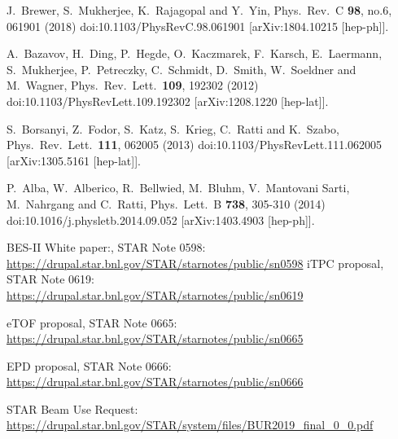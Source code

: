 \begin{thebibliography}{99}
J.~Brewer, S.~Mukherjee, K.~Rajagopal and Y.~Yin,
Phys.\ Rev.\ C \textbf{98}, no.6, 061901 (2018)
doi:10.1103/PhysRevC.98.061901
[arXiv:1804.10215 [hep-ph]].

A.~Bazavov, H.~Ding, P.~Hegde, O.~Kaczmarek, F.~Karsch, E.~Laermann, S.~Mukherjee, P.~Petreczky, C.~Schmidt, D.~Smith, W.~Soeldner and M.~Wagner,
Phys.\ Rev.\ Lett.\  \textbf{109}, 192302 (2012)
doi:10.1103/PhysRevLett.109.192302
[arXiv:1208.1220 [hep-lat]].

S.~Borsanyi, Z.~Fodor, S.~Katz, S.~Krieg, C.~Ratti and K.~Szabo,
Phys.\ Rev.\ Lett.\  \textbf{111}, 062005 (2013)
doi:10.1103/PhysRevLett.111.062005
[arXiv:1305.5161 [hep-lat]].


P.~Alba, W.~Alberico, R.~Bellwied, M.~Bluhm, V.~Mantovani Sarti, M.~Nahrgang and C.~Ratti,
Phys.\ Lett.\ B \textbf{738}, 305-310 (2014)
doi:10.1016/j.physletb.2014.09.052
[arXiv:1403.4903 [hep-ph]].


 
BES-II White paper:, STAR Note 0598: \\
\url{https://drupal.star.bnl.gov/STAR/starnotes/public/sn0598}
iTPC proposal, STAR Note 0619:\\
 \url{https://drupal.star.bnl.gov/STAR/starnotes/public/sn0619}

eTOF proposal, STAR Note 0665:\\
 \url{https://drupal.star.bnl.gov/STAR/starnotes/public/sn0665}

EPD proposal, STAR Note 0666: \\
\url{https://drupal.star.bnl.gov/STAR/starnotes/public/sn0666}
  
   STAR Beam Use Request:\\
  \url{https://drupal.star.bnl.gov/STAR/system/files/BUR2019_final_0_0.pdf}



\end{thebibliography}
